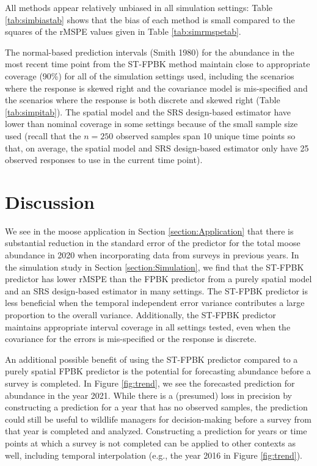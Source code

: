 \documentclass[smallextended]{svjour3}       %
\begin{document}
All methods appear relatively unbiased in all simulation settings: Table
\ref{tab:simbiastab} shows that the bias of each method is small
compared to the squares of the rMSPE values given in Table
\ref{tab:simrmspetab}.

The normal-based prediction intervals (Smith 1980) for the abundance in
the most recent time point from the ST-FPBK method maintain close to
appropriate coverage (90\%) for all of the simulation settings used,
including the scenarios where the response is skewed right and the
covariance model is mis-specified and the scenarios where the response
is both discrete and skewed right (Table \ref{tab:simpitab}). The
spatial model and the SRS design-based estimator have lower than nominal
coverage in some settings because of the small sample size used (recall
that the \(n = 250\) observed samples span 10 unique time points so
that, on average, the spatial model and SRS design-based estimator only
have 25 observed responses to use in the current time point).

\hypertarget{section:Discussion}{%
\section{Discussion}\label{section:Discussion}}

We see in the moose application in Section \ref{section:Application}
that there is substantial reduction in the standard error of the
predictor for the total moose abundance in 2020 when incorporating data
from surveys in previous years. In the simulation study in Section
\ref{section:Simulation}, we find that the ST-FPBK predictor has lower
rMSPE than the FPBK predictor from a purely spatial model and an SRS
design-based estimator in many settings. The ST-FPBK predictor is less
beneficial when the temporal independent error variance contributes a
large proportion to the overall variance. Additionally, the ST-FPBK
predictor maintains appropriate interval coverage in all settings
tested, even when the covariance for the errors is mis-specified or the
response is discrete.

An additional possible benefit of using the ST-FPBK predictor compared
to a purely spatial FPBK predictor is the potential for forecasting
abundance before a survey is completed. In Figure \ref{fig:trend}, we
see the forecasted prediction for abundance in the year 2021. While
there is a (presumed) loss in precision by constructing a prediction for
a year that has no observed samples, the prediction could still be
useful to wildlife managers for decision-making before a survey from
that year is completed and analyzed. Constructing a prediction for years
or time points at which a survey is not completed can be applied to
other contexts as well, including temporal interpolation (e.g., the year
2016 in Figure \ref{fig:trend}).
\end{document}
